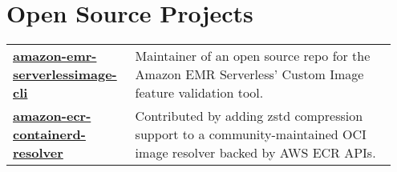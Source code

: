 \documentclass[letterpaper,11pt]{article}
\begin{document}
\begin{itemize}[leftmargin=0.15in, label={}]

\end{itemize}

\section{Open Source Projects}
\begin{tabular*}{\textwidth}{p{0.30\linewidth}p{0.65\linewidth}}
    \small{\textbf{\href{https://github.com/awslabs/amazon-emr-serverless-image-cli}{amazon-emr-serverlessimage-cli}}} & \small{Maintainer of an open source repo for the Amazon EMR Serverless' Custom Image feature validation tool.}\\
    \small{\textbf{\href{https://github.com/awslabs/amazon-ecr-containerd-resolver/pull/35}{amazon-ecr-containerd-resolver}}} & \small{Contributed by adding zstd compression support to a community-maintained OCI image resolver backed by AWS ECR APIs.}\\
\end{tabular*}
\end{document}
